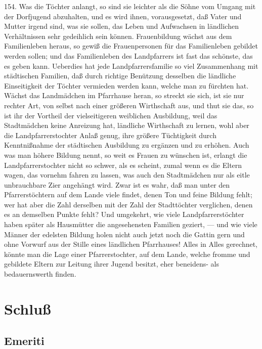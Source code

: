 154. Was die Töchter anlangt, so sind sie leichter als die Söhne vom Umgang mit der Dorfjugend abzuhalten, und es wird ihnen, vorausgesetzt, daß Vater und Mutter irgend sind, was sie sollen, das Leben und Aufwachsen in ländlichen Verhältnissen sehr gedeihlich sein können. Frauenbildung wächst aus dem Familienleben heraus, so gewiß die Frauenpersonen für das Familienleben gebildet werden sollen; und das Familienleben des Landpfarrers ist fast das schönste, das es geben kann. Ueberdies hat jede Landpfarrersfamilie so viel Zusammenhang mit städtischen Familien, daß durch richtige Benützung desselben die ländliche Einseitigkeit der Töchter vermieden werden kann, welche man zu fürchten hat. Wächst das Landmädchen im Pfarrhause heran, so streckt sie sich, ist sie nur rechter Art, von
selbst nach einer größeren Wirthschaft aus, und thut sie das, so ist ihr der Vortheil der vielseitigeren weiblichen Ausbildung, weil das Stadtmädchen keine Anreizung hat, ländliche Wirthschaft zu lernen, wohl aber die Landpfarrerstochter Anlaß genug, ihre größere Tüchtigkeit durch Kenntnißnahme der städtischen Ausbildung zu ergänzen und zu erhöhen. Auch was man höhere Bildung nennt, so weit es Frauen zu wünschen ist, erlangt die Landpfarrerstochter nicht so schwer, als es scheint, zumal wenn es die Eltern wagen, das vornehm fahren zu lassen, was auch den Stadtmädchen nur als eitle unbrauchbare Zier angehängt wird. Zwar ist es wahr, daß man unter den Pfarrerstöchtern auf dem Lande viele findet, denen Ton und feine Bildung fehlt; wer hat aber die Zahl derselben mit der Zahl der Stadttöchter verglichen, denen es an demselben Punkte fehlt? Und umgekehrt, wie viele Landpfarrerstöchter haben später als Hausmütter die angesehensten Familien geziert, — und wie viele Männer der edelsten Bildung holen nicht auch jetzt noch die Gattin gern und ohne Vorwurf aus der Stille eines ländlichen Pfarrhauses! Alles in Alles gerechnet, könnte man die Lage einer Pfarrerstochter, auf dem Lande, welche fromme und gebildete Eltern zur Leitung ihrer Jugend besitzt, eher beneidens- als bedauernswerth finden.

\chapter{Schluß}

\section{Emeriti}

